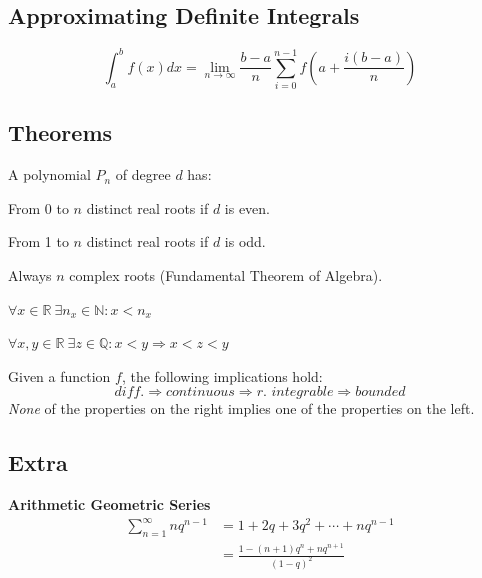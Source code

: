 \documentclass[8pt,a4paper]{extarticle}     %
\theoremstyle{definition}
\theoremstyle{definition}
\theoremstyle{definition}
\newcommand{\R}{\mathbb{R}}
\newcommand{\N}{\mathbb{N}}
\newcommand{\Q}{\mathbb{Q}}
\begin{document}
\begin{multicols}{4}
\subsection{Approximating Definite Integrals}
$$\int_a^b f(x)dx = \lim_{n\to\infty} \frac{b-a}{n}\sum_{i=0}^{n-1} f\left(a+\frac{i(b-a)}{n}\right)$$

\subsection{Theorems}
\begin{boxtheorem}
	A polynomial $P_n$ of degree $d$ has:
	\begin{bulletlist}
		\item From 0 to $n$ distinct real roots if $d$ is even.
		\item From 1 to $n$ distinct real roots if $d$ is odd.
		\item Always $n$ complex roots (Fundamental Theorem of Algebra).
	\end{bulletlist}
\end{boxtheorem}

\begin{boxtheorem}
	$\forall x\in\R \ \exists n_x\in\N: x < n_x$
\end{boxtheorem}

\begin{boxtheorem}
	$\forall x,y\in\R \ \exists z \in \Q: x<y \Rightarrow x<z<y$
\end{boxtheorem}

\begin{boxtheorem}
Given a function $f$, the following implications hold:
$$\textit{diff.} \Rightarrow \textit{continuous} \Rightarrow \textit{r. integrable} \Rightarrow \textit{bounded}$$
\textit{None} of the properties on the right implies one of the properties on the left.
\end{boxtheorem}

\subsection{Extra}
\textbf{Arithmetic Geometric Series}
\[
\begin{split}
	\sum_{n=1}^\infty nq^{n-1} &= 1+2q+3q^2+\cdots+nq^{n-1} \\
	&= \frac{1-(n+1)q^n+nq^{n+1}}{(1-q)^2}
\end{split}
\]

\vfill\eject
\columnbreak


\end{multicols}
\end{document}
